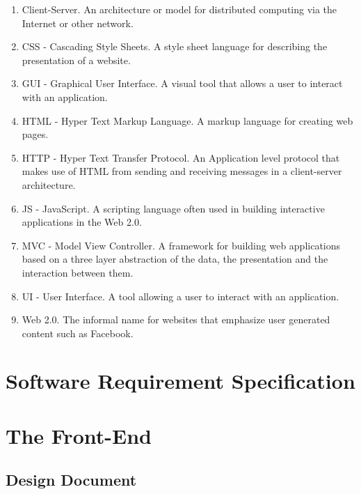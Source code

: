 \documentclass[12pt,onecolumn]{article}
\begin{document}
	\begin{enumerate}
		\item Client-Server. An architecture or model for distributed computing via the Internet or other network.

		\item CSS - Cascading Style Sheets. A style sheet language for describing the presentation of a website.

		\item GUI - Graphical User Interface. A visual tool that allows a user to interact with an application.

		\item HTML - Hyper Text Markup Language. A markup language for creating web pages.

		\item HTTP - Hyper Text Transfer Protocol. An Application level protocol that makes use of HTML from sending and receiving messages in a client-server architecture.

		\item JS - JavaScript. A scripting language often used in building interactive applications in the Web 2.0.

		\item MVC - Model View Controller. A framework for building web applications based on a three layer abstraction of the data, the presentation and the interaction between them. 

		\item UI - User Interface. A tool allowing a user to interact with an application.

		\item Web 2.0. The informal name for websites that emphasize user generated content such as Facebook.


	\end{enumerate}

\section{Software Requirement Specification} %

\section{The Front-End}

	

	\subsection{Design Document} %
\end{document}
